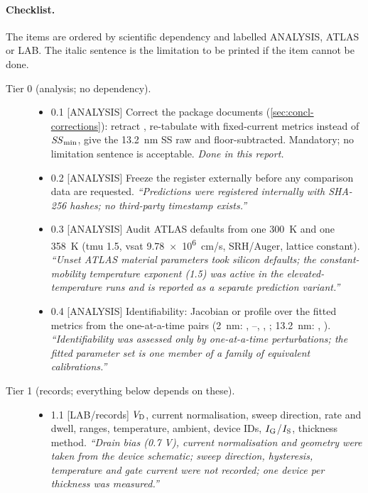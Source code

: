 \paragraph{Checklist.} The items are ordered by scientific dependency and labelled ANALYSIS, ATLAS or LAB. The italic sentence is the limitation to be printed if the item cannot be done.

\begin{description}
  \item[Tier 0 (analysis; no dependency).]
  \begin{itemize}
    \item 0.1 [ANALYSIS] Correct the package documents (\cref{sec:concl-corrections}): retract , re-tabulate with fixed-current metrics instead of $\mathit{SS}_{\min}$, give the 13.2~nm SS raw and floor-subtracted. Mandatory; no limitation sentence is acceptable. \emph{Done in this report.}
    \item 0.2 [ANALYSIS] Freeze the register externally before any comparison data are requested. \emph{``Predictions were registered internally with SHA-256 hashes; no third-party timestamp exists.''}
    \item 0.3 [ANALYSIS] Audit ATLAS defaults from one 300~K and one 358~K  (tmu 1.5, vsat \SI{9.78e6}{cm/s}, SRH/Auger, lattice constant). \emph{``Unset ATLAS material parameters took silicon defaults; the constant-mobility temperature exponent (1.5) was active in the elevated-temperature runs and is reported as a separate prediction variant.''}
    \item 0.4 [ANALYSIS] Identifiability: Jacobian or profile over the fitted metrics from the one-at-a-time pairs (2~nm: , --, , ; 13.2~nm: , ). \emph{``Identifiability was assessed only by one-at-a-time perturbations; the fitted parameter set is one member of a family of equivalent calibrations.''}
  \end{itemize}
  \item[Tier 1 (records; everything below depends on these).]
  \begin{itemize}
    \item 1.1 [LAB/records] $V_{\mathrm{D}}$, current normalisation, sweep direction, rate and dwell, ranges, temperature, ambient, device IDs, $I_{\mathrm{G}}$/$I_{\mathrm{S}}$, thickness method. \emph{``Drain bias (0.7 V), current normalisation and geometry were taken from the device schematic; sweep direction, hysteresis, temperature and gate current were not recorded; one device per thickness was measured.''}

\end{itemize}
\end{description}
